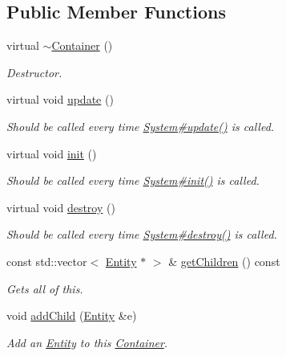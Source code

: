 \subsection*{Public Member Functions}
\begin{DoxyCompactItemize}
\item 
virtual \hyperlink{classmc_1_1_container_ae9a0af1e1ea151ba9f5654b4f3a5494b}{$\sim$\+Container} ()
\begin{DoxyCompactList}\small\item\em Destructor. \end{DoxyCompactList}\item 
virtual void \hyperlink{classmc_1_1_container_a306bb7d15cee23ff8bef4b9342ed85cf}{update} ()
\begin{DoxyCompactList}\small\item\em Should be called every time \hyperlink{classmc_1_1_system_a90e14e44eb5a6019c913a6a197deb4a0}{System\#update()} is called. \end{DoxyCompactList}\item 
virtual void \hyperlink{classmc_1_1_container_a087d26907d06163aa731d9a313163b7f}{init} ()
\begin{DoxyCompactList}\small\item\em Should be called every time \hyperlink{classmc_1_1_system_a86b7559895967af432c5c3db728bd0bc}{System\#init()} is called. \end{DoxyCompactList}\item 
virtual void \hyperlink{classmc_1_1_container_a80bd71e4e12ec218e4de88f4e48cc771}{destroy} ()
\begin{DoxyCompactList}\small\item\em Should be called every time \hyperlink{}{System\#destroy()} is called. \end{DoxyCompactList}\item 
const std\+::vector$<$ \hyperlink{classmc_1_1_entity}{Entity} $\ast$ $>$ \& \hyperlink{classmc_1_1_container_a2455ff127249ab0b128fe54eeeaf72e3}{get\+Children} () const 
\begin{DoxyCompactList}\small\item\em Gets all of this. \end{DoxyCompactList}\item 
void \hyperlink{classmc_1_1_container_a7de8a7bfe45c8a869149de774019e42c}{add\+Child} (\hyperlink{classmc_1_1_entity}{Entity} \&e)
\begin{DoxyCompactList}\small\item\em Add an \hyperlink{classmc_1_1_entity}{Entity} to this \hyperlink{classmc_1_1_container}{Container}. \end{DoxyCompactList}\item 

\end{DoxyCompactItemize}
